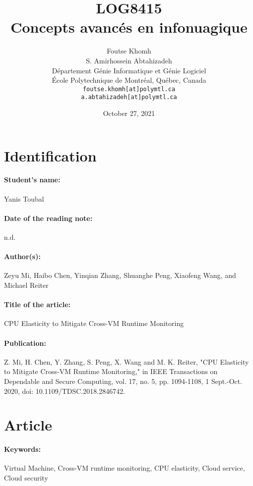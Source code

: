 \documentclass[11pt]{article}
\title{LOG8415\\Concepts avanc\'{e}s en infonuagique}
\author{
    Foutse Khomh \\
    S. Amirhossein Abtahizadeh \\
    D\'{e}partement G\'{e}nie Informatique et G\'{e}nie Logiciel \\
    \'{E}cole Polytechnique de Montr\'{e}al, Qu\'{e}bec, Canada \\
    \texttt{foutse.khomh[at]polymtl.ca} \\
    \texttt{a.abtahizadeh[at]polymtl.ca}
}
\date{October 27, 2021}
\def\titre{CPU Elasticity to Mitigate Cross-VM Runtime
Monitoring
}
\def\auteur{Yanis Toubal}
\begin{document}
\maketitle

\section{Identification}

\paragraph{Student's name:} \auteur

\paragraph{Date of the reading note:} {n.d.}

\paragraph{Author(s):} {Zeyu Mi, Haibo Chen, Yinqian Zhang, Shuanghe Peng, Xiaofeng Wang, and Michael Reiter}

\paragraph{Title of the article:} \titre

\paragraph{Publication:} {Z. Mi, H. Chen, Y. Zhang, S. Peng, X. Wang and M. K. Reiter, "CPU Elasticity to Mitigate Cross-VM Runtime Monitoring," in IEEE Transactions on Dependable and Secure Computing, vol. 17, no. 5, pp. 1094-1108, 1 Sept.-Oct. 2020, doi: 10.1109/TDSC.2018.2846742.}

\section{Article}

\paragraph{Keywords:} {Virtual Machine, Cross-VM runtime monitoring, CPU elasticity, Cloud service, Cloud security}
\end{document}
